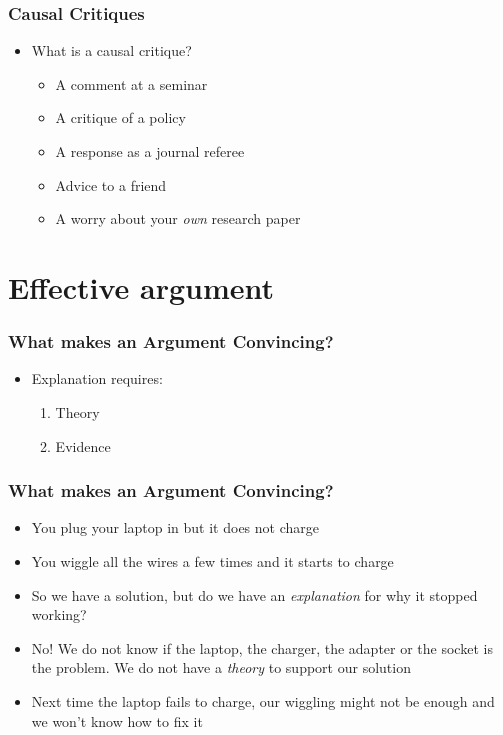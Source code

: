 \documentclass[xcolor=x11names,compress]{beamer}\usepackage[]{graphicx}\usepackage[]{color}
\renewcommand{\(}{\begin{columns}}
\renewcommand{\)}{\end{columns}}
\newcommand{\<}[1]{\begin{column}{#1}}
\renewcommand{\>}{\end{column}}
\begin{document}
\begin{frame}
\frametitle{Causal Critiques}
\begin{itemize}
\item What is a causal critique?
\begin{itemize}
\item A comment at a seminar
\pause
\item A critique of a policy
\pause
\item A response as a journal referee
\pause
\item Advice to a friend
\pause
\item A worry about your \textit{own} research paper
\end{itemize}
\end{itemize}
\end{frame}

\section{Effective argument}

\begin{frame}
\frametitle{What makes an Argument Convincing?}
\begin{itemize}
\item  Explanation requires:
\begin{enumerate}
\item  Theory
\item  Evidence
\end{enumerate}
\end{itemize}
\end{frame}

\begin{frame}
\frametitle{What makes an Argument Convincing?}
\begin{itemize}
\item  You plug your laptop in but it does not charge
\pause
\item You wiggle all the wires a few times and it starts to charge
\pause
\item So we have a solution, but do we have an \textit{explanation} for why it stopped working?
\pause
\item No! We do not know if the laptop, the charger, the adapter or the socket is the problem. We do not have a \textit{theory} to support our solution
\pause
\item Next time the laptop fails to charge, our wiggling might not be enough and we won't know how to fix it
\end{itemize}
\end{frame}
\end{document}
